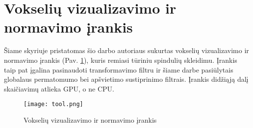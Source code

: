 \section{Vokselių vizualizavimo ir normavimo įrankis}

Šiame skyriuje pristatomas šio darbo autoriaus sukurtas vokselių vizualizavimo
ir normavimo įrankis (Pav. \ref{fig:tool}), kuris remiasi tūriniu spindulių
skleidimu. Įrankis taip pat įgalina pasinaudoti transformavimo filtru ir šiame
darbe pasiūlytais globalaus permatomumo bei apšvietimo sustiprinimo filtrais.
Įrankis didžiąją dalį skaičiavimų atlieka GPU, o ne CPU.

\begin{figure}[!ht]
\centering
\texttt{[image: tool.png]}
\caption{Vokselių vizualizavimo ir normavimo įrankis}
\label{fig:tool}
\end{figure}

